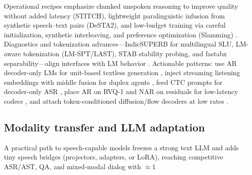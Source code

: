 \documentclass{article}
\begin{document}
Operational recipes emphasize chunked unspoken reasoning to improve quality without added latency (STITCH), lightweight paralinguistic infusion from synthetic speech--text pairs (DeSTA2), and low-budget training via careful initialization, synthetic interleaving, and preference optimization (Slamming) \cite{chiang2025stitchsimultaneousthinkingtalkingchunked,lu2025desta2developinginstructionfollowingspee,maimon2025slammingtrainingspeechlanguagemodelonegp}. Diagnostics and tokenization advances---IndicSUPERB for multilingual SLU, LM-aware tokenization (LM-SPT/LAST), STAB stability probing, and fastabx separability---align interfaces with LM behavior \cite{entry2025indicsuperbspeechprocessinguniversalperf,jo2025lmsptalignedsemanticdistillationspeechto,turetzky2024lastlanguagemodelawarespeechtokenization,vashishth2024stabspeechtokenizerassessmentbenchmark,poli2025fastabxlibraryefficientcomputationabxdis}. Actionable patterns: use AR decoder-only LMs for unit-based textless generation \cite{nakata2024jchatjapaneselargescalespokendialoguecor}, inject streaming listening embeddings with middle fusion for duplex agents \cite{ma2024languagemodelcanlistenwhilespeaking}, feed CTC prompts for decoder-only ASR \cite{tsunoo2024decoderonlyarchitecturespeechrecognition}, place AR on RVQ-1 and NAR on residuals for low-latency codecs \cite{min2025speechretrievalaugmentedgenerationwithou,li2024investigatingneuralaudiocodecsspeechlang}, and attach token-conditioned diffusion/flow decoders at low rates \cite{yang2025diffsoundstreamefficientspeechtokenizati,jo2025lmsptalignedsemanticdistillationspeechto,vashishth2024stabspeechtokenizerassessmentbenchmark}.

\subsection{Modality transfer and LLM adaptation} \label{subsec:modalitytransferandllmadaptation}
A practical path to speech-capable models freezes a strong text LLM and adds tiny speech bridges (projectors, adapters, or LoRA), reaching competitive ASR/AST, QA, and mixed-modal dialog with $\approx$1%
\end{document}
